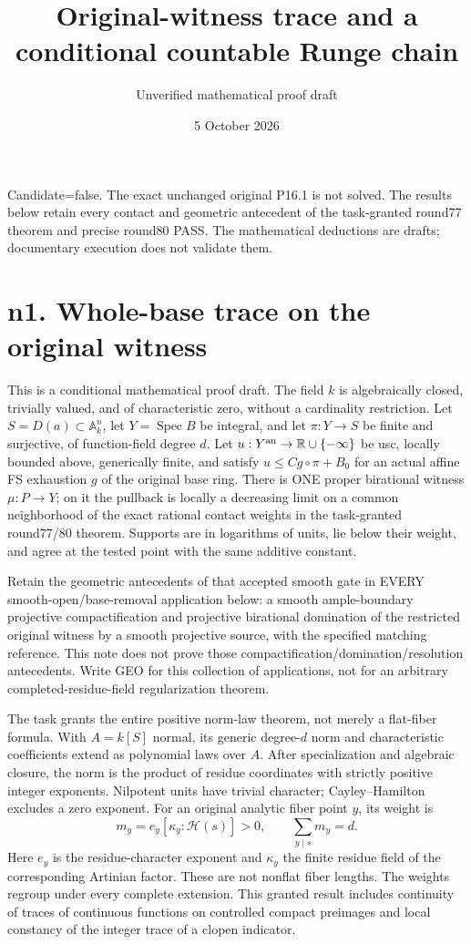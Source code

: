 \documentclass[
  10pt,
]{article}
\title{Original-witness trace and a conditional countable Runge chain}
\author{Unverified mathematical proof draft}
\date{5 October 2026}
\begin{document}
\maketitle

Candidate=false. The exact unchanged original P16.1 is not solved. The
results below retain every contact and geometric antecedent of the
task-granted round77 theorem and precise round80 PASS. The mathematical
deductions are drafts; documentary execution does not validate them.

\section{n1. Whole-base trace on the original
witness}\label{n1.-whole-base-trace-on-the-original-witness}

This is a conditional mathematical proof draft. The field \(k\) is
algebraically closed, trivially valued, and of characteristic zero,
without a cardinality restriction. Let \(S=D(a)\subset\mathbb A_k^n\),
let \(Y=\operatorname{Spec} B\) be integral, and let \(\pi:Y\to S\) be
finite and surjective, of function-field degree \(d\). Let
\(u:Y^{\rm an}\to\mathbb R\cup\{-\infty\}\) be usc, locally bounded
above, generically finite, and satisfy \(u\le Cg\circ\pi+B_0\) for an
actual affine FS exhaustion \(g\) of the original base ring. There is
ONE proper birational witness \(\mu:P\to Y\); on it the pullback is
locally a decreasing limit on a common neighborhood of the exact
rational contact weights in the task-granted round77/80 theorem.
Supports are in logarithms of units, lie below their weight, and agree
at the tested point with the same additive constant.

Retain the geometric antecedents of that accepted smooth gate in EVERY
smooth-open/base-removal application below: a smooth ample-boundary
projective compactification and projective birational domination of the
restricted original witness by a smooth projective source, with the
specified matching reference. This note does not prove those
compactification/domination/resolution antecedents. Write GEO for this
collection of applications, not for an arbitrary completed-residue-field
regularization theorem.

The task grants the entire positive norm-law theorem, not merely a
flat-fiber formula. With \(A=k[S]\) normal, its generic degree-\(d\)
norm and characteristic coefficients extend as polynomial laws over
\(A\). After specialization and algebraic closure, the norm is the
product of residue coordinates with strictly positive integer exponents.
Nilpotent units have trivial character; Cayley--Hamilton excludes a zero
exponent. For an original analytic fiber point \(y\), its weight is \[
 m_y=e_y[\kappa_y:\mathcal H(s)]>0,\qquad\sum_{y\mid s}m_y=d.
\] Here \(e_y\) is the residue-character exponent and \(\kappa_y\) the
finite residue field of the corresponding Artinian factor. These are not
nonflat fiber lengths. The weights regroup under every complete
extension. This granted result includes continuity of traces of
continuous functions on controlled compact preimages and local constancy
of the integer trace of a clopen indicator.
\end{document}
